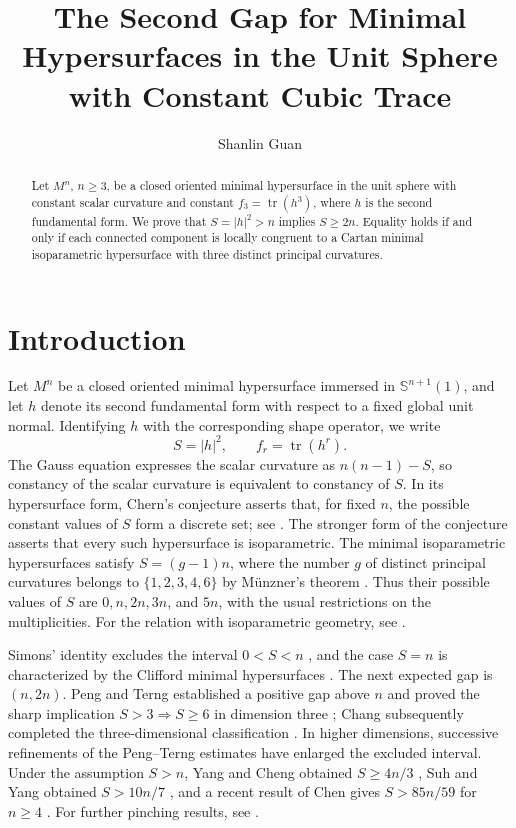 \documentclass[11pt,reqno]{amsart}
\title[The second gap with constant cubic trace]{The Second Gap for Minimal Hypersurfaces in the Unit Sphere with Constant Cubic Trace}
\author[S. Guan]{Shanlin Guan}
\date{}
\numberwithin{equation}{section}
\newcommand{\Sph}{\mathbb S}
\newcommand{\tr}{\operatorname{tr}}
\newcommand{\norm}[1]{\lvert #1\rvert}
\begin{document}
\begin{abstract}
Let $M^n$, $n\ge3$, be a closed oriented minimal hypersurface in the unit sphere with constant scalar curvature and constant $f_3=\tr(h^3)$, where $h$ is the second fundamental form. We prove that $S=\norm h^2>n$ implies $S\ge2n$. Equality holds if and only if each connected component is locally congruent to a Cartan minimal isoparametric hypersurface with three distinct principal curvatures.
\end{abstract}

\maketitle

\section{Introduction}

Let $M^n$ be a closed oriented minimal hypersurface immersed in $\Sph^{n+1}(1)$, and let $h$ denote its second fundamental form with respect to a fixed global unit normal. Identifying $h$ with the corresponding shape operator, we write
\[
S=\norm h^2,\qquad f_r=\tr(h^r).
\]
The Gauss equation expresses the scalar curvature as $n(n-1)-S$, so constancy of the scalar curvature is equivalent to constancy of $S$. In its hypersurface form, Chern's conjecture asserts that, for fixed $n$, the possible constant values of $S$ form a discrete set; see \cite{Yau1982}. The stronger form of the conjecture asserts that every such hypersurface is isoparametric. The minimal isoparametric hypersurfaces satisfy $S=(g-1)n$, where the number $g$ of distinct principal curvatures belongs to $\{1,2,3,4,6\}$ by M\"unzner's theorem \cite{Munzner1980,Munzner1981}. Thus their possible values of $S$ are $0,n,2n,3n$, and $5n$, with the usual restrictions on the multiplicities. For the relation with isoparametric geometry, see \cite{Cecil2008,GeTang2012,ScherfnerWeissYau2012}.

Simons' identity excludes the interval $0<S<n$ \cite{Simons}, and the case $S=n$ is characterized by the Clifford minimal hypersurfaces \cite{CdCK,Lawson}. The next expected gap is $(n,2n)$. Peng and Terng established a positive gap above $n$ and proved the sharp implication $S>3\Rightarrow S\ge6$ in dimension three \cite{PTseminar,PTannalen}; Chang subsequently completed the three-dimensional classification \cite{Chang1993}. In higher dimensions, successive refinements of the Peng--Terng estimates have enlarged the excluded interval. Under the assumption $S>n$, Yang and Cheng obtained $S\ge4n/3$ \cite{YangCheng}, Suh and Yang obtained $S>10n/7$ \cite{SuhYang}, and a recent result of Chen gives $S>85n/59$ for $n\ge4$ \cite{Chen2026}. For further pinching results, see \cite{YangCheng1994,WeiXu2007,Zhang2010,DingXin2011,XuXu2017}.
\end{document}
